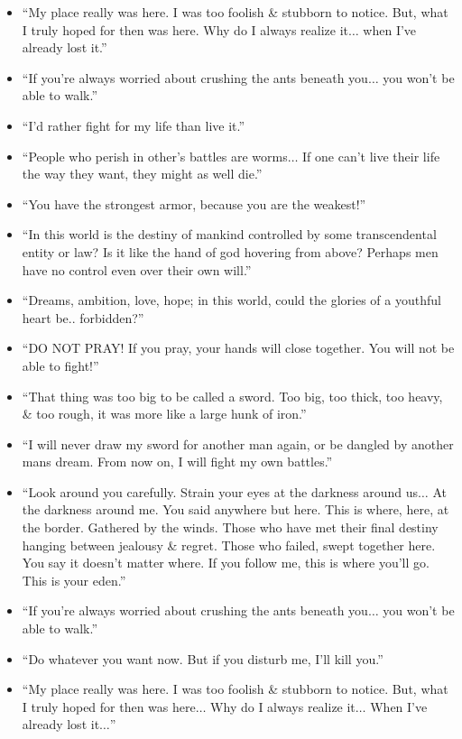 \documentclass{article}
\begin{document}
\begin{enumerate}
\begin{itemize}
    	\item ``My place really was here. I was too foolish \& stubborn to notice. But, what I truly hoped for then was here. Why do I always realize it$\ldots$ when I've already lost it.''
    	\item ``If you're always worried about crushing the ants beneath you$\ldots$ you won't be able to walk.''
    	\item ``I'd rather fight for my life than live it.''
    	\item ``People who perish in other's battles are worms$\ldots$ If one can't live their life the way they want, they might as well die.''
    	\item ``You have the strongest armor, because you are the weakest!''
    	\item ``In this world is the destiny of mankind controlled by some transcendental entity or law? Is it like the hand of god hovering from above? Perhaps men have no control even over their own will.''
    	\item ``Dreams, ambition, love, hope; in this world, could the glories of a youthful heart be.. forbidden?''
    	\item ``DO NOT PRAY! If you pray, your hands will close together. You will not be able to fight!''
    	\item ``That thing was too big to be called a sword. Too big, too thick, too heavy, \& too rough, it was more like a large hunk of iron.'' 
    	\item ``I will never draw my sword for another man again, or be dangled by another mans dream. From now on, I will fight my own battles.''
    	\item ``Look around you carefully. Strain your eyes at the darkness around us$\ldots$ At the darkness around me. You said anywhere but here. This is where, here, at the border. Gathered by the winds. Those who have met their final destiny hanging between jealousy \& regret. Those who failed, swept together here. You say it doesn't matter where. If you follow me, this is where you'll go. This is your eden.''
    	\item ``If you're always worried about crushing the ants beneath you$\ldots$ you won't be able to walk.''
    	\item ``Do whatever you want now. But if you disturb me, I'll kill you.''
    	\item ``My place really was here. I was too foolish \& stubborn to notice. But, what I truly hoped for then was here$\ldots$ Why do I always realize it$\ldots$ When I've already lost it$\ldots$''

\end{itemize}
\end{enumerate}
\end{document}

